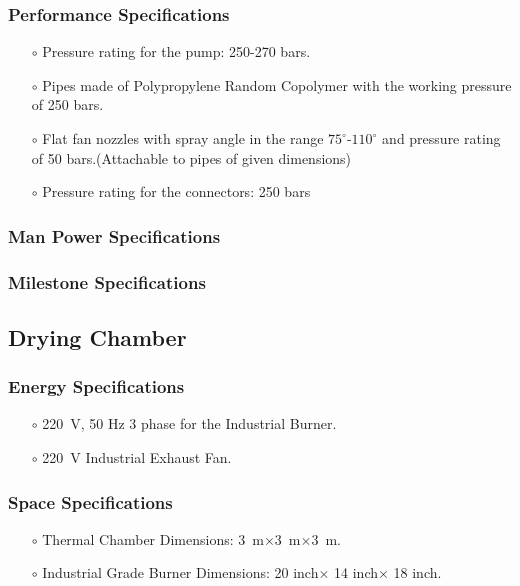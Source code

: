 \documentclass[12pt]{article}
\begin{document}
\subsubsection{Performance Specifications}
\begin{itemize}
    \item[$\scriptstyle\circ$] Pressure rating for the pump: 250-270 bars.
    \item[$\scriptstyle\circ$] Pipes made of \Gls{Polypropylene Random Copolymer} with the working pressure of 250 bars.
    \item[$\scriptstyle\circ$] Flat fan nozzles with spray angle in the range $75^\circ$-$110^\circ$ and pressure rating of 50 bars.(Attachable to pipes of given dimensions)
    \item[$\scriptstyle\circ$] Pressure rating for the connectors: 250 bars \cite{noauthor_thermoplastic_nodate}
\end{itemize}

\subsubsection{Man Power Specifications}

\subsubsection{Milestone Specifications}
\subsection{Drying Chamber}
\subsubsection{Energy Specifications}
\begin{itemize}
    \item[$\scriptstyle\circ$]\SI{220}{\volt}, 50 Hz 3 phase for the Industrial Burner.
    \item[$\scriptstyle\circ$] \SI{220}{\volt} Industrial Exhaust Fan.
\end{itemize}
\subsubsection{Space Specifications}
\begin{itemize}
    \item[$\scriptstyle\circ$]Thermal Chamber Dimensions: \SI{3}{\meter}$\times$\SI{3}{\meter}$\times$\SI{3}{\meter}.
    \item[$\scriptstyle\circ$]Industrial Grade Burner Dimensions: 20 inch$\times$ 14 inch$\times$ 18 inch.
\end{itemize}
\end{document}
